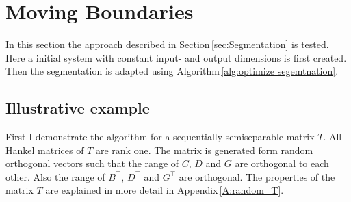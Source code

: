 \documentclass[doctype=mastersthesis,BCOR=15mm,biblatex]{ldvbook}%
\begin{document}
\section{Moving Boundaries}
In this section the approach described in Section\,\ref{sec:Segmentation} is tested.
Here a initial system with constant input- and output dimensions is first created.
Then the segmentation is adapted using Algorithm\,\ref{alg:optimize segemtnation}.

\subsection{Illustrative example}\label{sec:test_adao}
First I demonstrate the algorithm for a sequentially semiseparable matrix $T$.
All Hankel matrices of $T$ are rank one. 
The matrix is generated form random orthogonal vectors such that the range of $C$, $D$ and $G$ are orthogonal to each other.
Also the range of $B^\top$, $D^\top$ and $G^\top$ are orthogonal.
The properties of the matrix $T$ are explained in more detail in Appendix\,\ref{A:random_T}.
\end{document}
